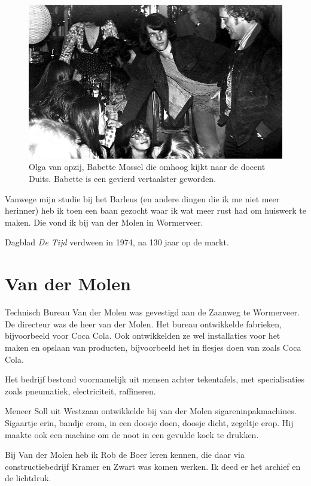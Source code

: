 \documentclass[10pt,twoside, openright]{memoir}
\begin{document}
\begin{figure}
\includegraphics[width=\textwidth]{img/ch39/aschool001}
\caption*{\footnotesize Olga van opzij, Babette Mossel die omhoog kijkt naar de docent Duits. Babette is een gevierd vertaalster geworden.}
\end{figure}

Vanwege mijn studie bij het Barleus (en andere dingen die ik me niet meer herinner) heb ik toen een baan gezocht waar ik wat meer rust had om huiswerk te maken. Die vond ik bij van der Molen in Wormerveer.

Dagblad \emph{De Tijd} verdween in 1974, na 130 jaar op de markt.

\chapter{Van der Molen} %
\label{cha:vandermolen}

Technisch Bureau Van der Molen was gevestigd aan de Zaanweg te Wormerveer. De directeur was de heer van der Molen. Het bureau ontwikkelde fabrieken, bijvoorbeeld voor Coca Cola. Ook ontwikkelden ze wel installaties voor het maken en opslaan van producten, bijvoorbeeld het in flesjes doen van zoals Coca Cola. 

Het bedrijf bestond voornamelijk uit mensen achter tekentafels, met specialisaties zoals pneumatiek, electriciteit, raffineren.

Meneer Soll uit Westzaan ontwikkelde bij van der Molen  sigareninpakmachines. Sigaartje erin, bandje erom, in een doosje doen, doosje dicht, zegeltje erop. Hij maakte ook een machine om de noot in een gevulde koek te drukken. 

Bij Van der Molen heb ik Rob de Boer leren kennen, die daar via constructiebedrijf Kramer en Zwart was komen werken. Ik deed er het archief en de lichtdruk. 
\end{document}
